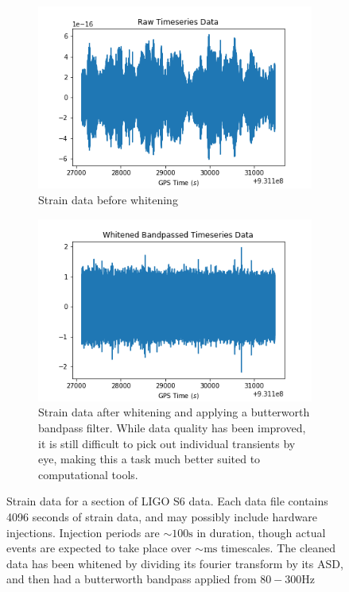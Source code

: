 \documentclass{article}
\begin{document}
\begin{figure}
\begin{subfigure}[t]{0.5\textwidth}
\includegraphics[width=\textwidth]{dirty.png}
\caption{Strain data before whitening}
\label{fig:dirty}
\end{subfigure}
\begin{subfigure}[t]{0.5\textwidth}
\includegraphics[width=\textwidth]{clean.png}
\caption{Strain data after whitening and applying a butterworth bandpass filter. While data quality has been improved, it is still difficult to pick out individual transients by eye, making this a task much better suited to computational tools.}
\label{fig:clean}
\end{subfigure}
\caption{Strain data for a section of LIGO S6 data. Each data file contains 4096 seconds of strain data, and may possibly include hardware injections. Injection periods are $\sim100\mathrm{s}$ in duration, though actual events are expected to take place over $\sim\mathrm{ms}$ timescales. The cleaned data has been whitened by dividing its fourier transform by its ASD, and then had a butterworth bandpass applied from $80-300\mathrm{Hz}$}
\label{fig:cleaning}
\end{figure}
\end{document}
